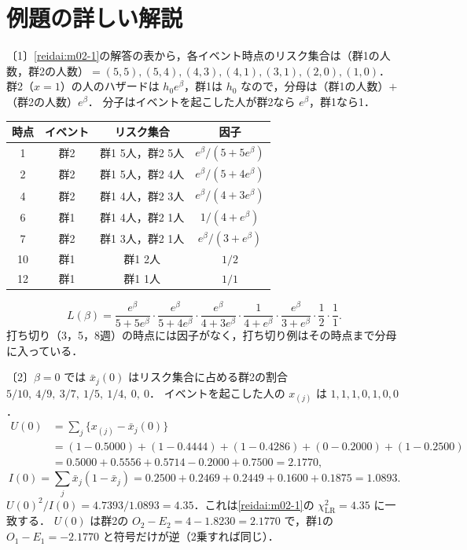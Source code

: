 \documentclass[a4paper,11pt,openany]{ltjsbook}
\newenvironment{kaitou}[1]{%
  \par\medskip\noindent
  \begin{tcolorbox}[enhanced,breakable,colback=bkgray!3,colframe=bkgray!60,boxrule=0.4pt,
    left=4pt,right=4pt,top=2pt,bottom=2pt,arc=1pt,
    title={\cref{#1}の解答},fonttitle=\bfseries\small,coltitle=white,colbacktitle=bkgray!80]}%
  {\end{tcolorbox}\par}
\begin{document}
\section{例題の詳しい解説}\label{sec:m03-kaisetsu}
\begin{kaitou}{reidai:m03-1}
〔1〕\cref{reidai:m02-1}の解答の表から，各イベント時点のリスク集合は（群1の人数，群2の人数）$=(5,5),(5,4),(4,3),(4,1),(3,1),(2,0),(1,0)$．
群2（$x=1$）の人のハザードは $h_0e^\beta$，群1は $h_0$ なので，分母は（群1の人数）$+$（群2の人数）$e^\beta$．
分子はイベントを起こした人が群2なら $e^\beta$，群1なら1．
\begin{center}\small
\begin{tabular}{@{}cccc@{}}
\toprule
時点 & イベント & リスク集合 & 因子\\
\midrule
1 & 群2 & 群1 5人，群2 5人 & $e^\beta/(5+5e^\beta)$\\
2 & 群2 & 群1 5人，群2 4人 & $e^\beta/(5+4e^\beta)$\\
4 & 群2 & 群1 4人，群2 3人 & $e^\beta/(4+3e^\beta)$\\
6 & 群1 & 群1 4人，群2 1人 & $1/(4+e^\beta)$\\
7 & 群2 & 群1 3人，群2 1人 & $e^\beta/(3+e^\beta)$\\
10 & 群1 & 群1 2人 & $1/2$\\
12 & 群1 & 群1 1人 & $1/1$\\
\bottomrule
\end{tabular}
\end{center}
\[
L(\beta)=\frac{e^\beta}{5+5e^\beta}\cdot\frac{e^\beta}{5+4e^\beta}\cdot\frac{e^\beta}{4+3e^\beta}\cdot\frac{1}{4+e^\beta}\cdot\frac{e^\beta}{3+e^\beta}\cdot\frac12\cdot\frac11 .
\]
打ち切り（3，5，8週）の時点には因子がなく，打ち切り例はその時点まで分母に入っている．

〔2〕$\beta=0$ では $\bar x_j(0)$ はリスク集合に占める群2の割合 $5/10,\ 4/9,\ 3/7,\ 1/5,\ 1/4,\ 0,\ 0$．
イベントを起こした人の $x_{(j)}$ は $1,1,1,0,1,0,0$．
\begin{align*}
U(0)&=\sum_j\{x_{(j)}-\bar x_j(0)\}\\
&=(1-0.5000)+(1-0.4444)+(1-0.4286)+(0-0.2000)+(1-0.2500)\\
&=0.5000+0.5556+0.5714-0.2000+0.7500=2.1770,
\end{align*}
\[
I(0)=\sum_j\bar x_j(1-\bar x_j)=0.2500+0.2469+0.2449+0.1600+0.1875=1.0893 .
\]
$U(0)^2/I(0)=4.7393/1.0893=4.35$．これは\cref{reidai:m02-1}の $\chi^2_{\mathrm{LR}}=4.35$ に一致する．
$U(0)$ は群2の $O_2-E_2=4-1.8230=2.1770$ で，群1の $O_1-E_1=-2.1770$ と符号だけが逆（2乗すれば同じ）．
\end{kaitou}
\end{document}
